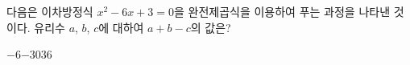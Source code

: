 다음은 이차방정식 $x^2-6x+3=0$을 완전제곱식을 이용하여 푸는 과정을 나타낸 것이다. 유리수 $a$, $b$, $c$에 대하여 $a+b-c$의 값은?
\begin{choices32}{$-6$}{$-3$}{$0$}{$3$}{$6$}\end{choices32}
